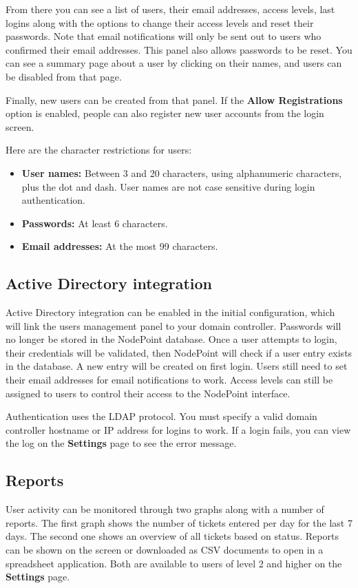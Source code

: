 \documentclass[11pt]{article}
\begin{document}
From there you can see a list of users, their email addresses, access levels, last logins along with the options to change their access levels and reset their passwords. Note that email notifications will only be sent out to users who confirmed their email addresses. This panel also allows passwords to be reset. You can see a summary page about a user by clicking on their names, and users can be disabled from that page.

Finally, new users can be created from that panel. If the \textbf{Allow Registrations} option is enabled, people can also register new user accounts from the login screen.

Here are the character restrictions for users:

\begin{itemize}
\item \textbf{User names:} Between 3 and 20 characters, using alphanumeric characters, plus the dot and dash. User names are not case sensitive during login authentication.
\item \textbf{Passwords:} At least 6 characters.
\item \textbf{Email addresses:} At the most 99 characters.
\end{itemize}

\subsection{Active Directory integration}
Active Directory integration can be enabled in the initial configuration, which will link the users management panel to your domain controller. Passwords will no longer be stored in the NodePoint database. Once a user attempts to login, their credentials will be validated, then NodePoint will check if a user entry exists in the database. A new entry will be created on first login. Users still need to set their email addresses for email notifications to work. Access levels can still be assigned to users to control their access to the NodePoint interface.

Authentication uses the LDAP protocol. You must specify a valid domain controller hostname or IP address for logins to work. If a login fails, you can view the log on the \textbf{Settings} page to see the error message.

\subsection{Reports}
User activity can be monitored through two graphs along with a number of reports. The first graph shows the number of tickets entered per day for the last 7 days. The second one shows an overview of all tickets based on status. Reports can be shown on the screen or downloaded as CSV documents to open in a spreadsheet application. Both are available to users of level 2 and higher on the \textbf{Settings} page.
\end{document}
